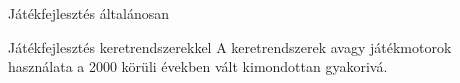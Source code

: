 \begin{MyChapter}{Játékfejlesztés általánosan}
\begin{MySection}{Játékfejlesztés keretrendszerekkel}
		A keretrendszerek avagy játékmotorok használata a 2000 körüli években vált kimondottan gyakorivá.
		
		
		
		
		\end{MySection}
	
\end{MyChapter}
		

